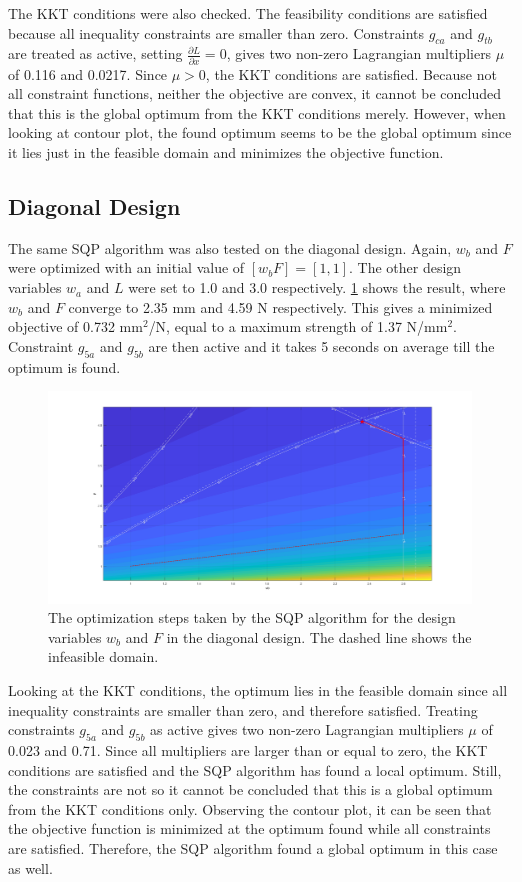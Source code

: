 The KKT conditions were also checked. 
The feasibility conditions are satisfied because all inequality constraints are smaller than zero. 
Constraints $g_{ca}$ and $g_{tb}$ are treated as active, setting $\frac{\partial L}{\partial x} = 0$, gives two non-zero Lagrangian multipliers $\mu$ of 0.116 and 0.0217. 
Since $\mu > 0$, the KKT conditions are satisfied. 
Because not all constraint functions, neither the objective are convex, it cannot be concluded that this is the global optimum from the KKT conditions merely. 
However, when looking at contour plot, the found optimum seems to be the global optimum since it lies just in the feasible domain and minimizes the objective function. 


\subsection{Diagonal Design}
The same SQP algorithm was also tested on the diagonal design. 
Again, $w_b$ and $F$ were optimized with an initial value of $[w_b F] = [1, 1]$. 
The other design variables $w_a$ and $L$ were set to 1.0 and 3.0 respectively. 
\cref{fig:diagopt} shows the result, where $w_b$ and $F$ converge to 2.35 mm and 4.59 N respectively. 
This gives a minimized objective of 0.732 mm$^2$/N, equal to a maximum strength of 1.37 N/mm$^2$. 
Constraint $g_{5a}$ and $g_{5b}$ are then active and it takes 5 seconds on average till the optimum is found.


\begin{figure}[H]
	\centering
	\includegraphics[width=\columnwidth]{sources/plots/diagonal2var.png}
	\caption{The optimization steps taken by the SQP algorithm for the design variables $w_b$ and $F$ in the diagonal design. 
		The dashed line shows the infeasible domain.}
	\label{fig:diagopt}
\end{figure}

Looking at the KKT conditions, the optimum lies in the feasible domain since all inequality constraints are smaller than zero, and therefore satisfied. 
Treating constraints $g_{5a}$ and $g_{5b}$ as active gives two non-zero Lagrangian multipliers $\mu$ of 0.023 and 0.71. 
Since all multipliers are larger than or equal to zero, the KKT conditions are satisfied and the SQP algorithm has found a local optimum. 
Still, the constraints are not  so it cannot be concluded that this is a global optimum from the KKT conditions only. 
Observing the contour plot, it can be seen that the objective function is minimized at the optimum found while all constraints are satisfied. 
Therefore, the SQP algorithm found a global optimum in this case as well.


